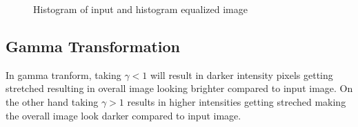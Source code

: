\documentclass[letterpaper, 10 pt, conference]{ieeeconf}  %
\begin{document}
\begin{figure}[h!]%
	\centering
    \qquad
    \caption{Histogram of input and histogram equalized image}%
    \label{fig:histogram_equalize2}%
\end{figure}



\subsection{\textbf{Gamma Transformation}}
In gamma tranform, taking $\gamma < 1$ will result in darker intensity pixels getting stretched resulting in overall image looking brighter compared to input image. On the other hand taking $\gamma > 1$ results in higher intensities getting streched making the overall image look darker compared to input image. 
\end{document}
